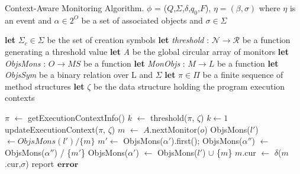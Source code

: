 \begin{algorithm}[t]
\caption[Algorithm]{Context-Aware Monitoring Algorithm. $\phi$ = 
($Q$,$\Sigma$,$\delta$,$q_{0}$,$F$), $\eta=(\beta, \sigma)$ where $\eta$ is an event and $\alpha \in 2^O$ 
be a set of associated objects and $\sigma \in \Sigma$}          %
\label{alg1}                           %
\begin{algorithmic}[1]                  
   \STATE \textbf{let} $\Sigma_{c} \in \Sigma$ be the set of creation symbols
   \STATE \textbf{let} \textit{threshold} : $\mathcal{N} \to \mathcal{R}$ be a 
function generating a threshold value
   \STATE \textbf{let} \textit{A} be the global circular array of monitors
   \STATE \textbf{let} \textit{ObjsMons} : $O \to \textit{MS}$ be a function
   \STATE \textbf{let} \textit{MonObjs} : $M \to L$ be a function
   \STATE \textbf{let} \textit{ObjsSym} be a binary relation over L and $\Sigma$
   \STATE \textbf{let} $\pi \in \Pi$ be a finite sequence of method structures
   \STATE \textbf{let} $\zeta$ be the data structure holding the program 
execution contexts
   
        \STATE $\pi$  $\leftarrow$ getExecutionContextInfo()
           \STATE $k$ $\leftarrow$ threshold($\pi$, $\zeta$)
        \ELSE
        	   \STATE $k \leftarrow 1$
        \ENDIF
        \STATE updateExecutionContext($\pi$, $\zeta$)
            	\STATE $m$ $\leftarrow$ $A$.nextMonitor($o$)
		\STATE ObjsMons($l'$) $\leftarrow  ObjsMons(l') / \{m\}$
        		\ENDFOR
				 \STATE $m' \leftarrow$ ObjsMons($\alpha'$).first();
					\STATE ObjsMons($\alpha''$) $\leftarrow$  
ObjsMons($\alpha''$) / \{$m'$\}
        				\ENDFOR
			\ENDIF
                		 \STATE ObjsMons($\alpha'$) $\leftarrow$  
ObjsMons($l'$) $\cup$ \{$m$\}
        		\ENDFOR
        \ENDIF
 \ENDIF
     \STATE $m$.cur $\leftarrow$ $\delta$($m$.cur,$\sigma$)
        \STATE report$\hspace{5pt}\textbf{error}$
     \ENDIF
 \ENDFOR
 
\end{algorithmic}

\end{algorithm}
\label{algo:monitoring}



